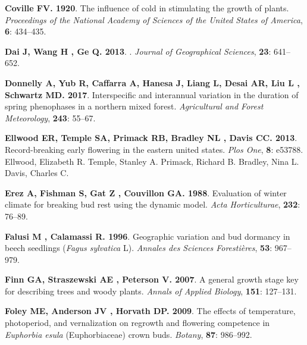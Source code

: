 \documentclass[11pt]{article}
\begin{document}
\begin{thebibliography}{69}
{\bf Coville FV}{\bf . 1920}.
\newblock The influence of cold in stimulating the growth of plants.
\newblock \emph{Proceedings of the National Academy of Sciences of the United
  States of America}, {\bf 6}: 434--435.

{\bf Dai J, Wang H , Ge Q}{\bf . 2013}.
.
\newblock \emph{Journal of Geographical Sciences}, {\bf 23}: 641--652.

{\bf Donnelly A, Yub R, Caffarra A, Hanesa J, Liang L, Desai AR, Liu L ,
  Schwartz MD}{\bf . 2017}.
\newblock Interspecific and interannual variation in the duration of spring
  phenophases in a northern mixed forest.
\newblock \emph{Agricultural and Forest Meteorology}, {\bf 243}: 55--67.

{\bf Ellwood ER, Temple SA, Primack RB, Bradley NL , Davis CC}{\bf . 2013}.
\newblock Record-breaking early flowering in the eastern united states.
\newblock \emph{Plos One}, {\bf 8}: e53788.
\newblock Ellwood, Elizabeth R. Temple, Stanley A. Primack, Richard B. Bradley,
  Nina L. Davis, Charles C.

{\bf Erez A, Fishman S, Gat Z , Couvillon GA}{\bf . 1988}.
\newblock Evaluation of winter climate for breaking bud rest using the dynamic
  model.
\newblock \emph{Acta Horticulturae}, {\bf 232}: 76--89.

{\bf Falusi M , Calamassi R}{\bf . 1996}.
\newblock Geographic variation and bud dormancy in beech seedlings
  (\textit{{F}agus sylvatica} {L}).
\newblock \emph{Annales des Sciences Foresti{\`e}res}, {\bf 53}: 967--979.

{\bf Finn GA, Straszewski AE , Peterson V}{\bf . 2007}.
\newblock A general growth stage key for describing trees and woody plants.
\newblock \emph{Annals of Applied Biology}, {\bf 151}: 127--131.

{\bf Foley ME, Anderson JV , Horvath DP}{\bf . 2009}.
\newblock The effects of temperature, photoperiod, and vernalization on
  regrowth and flowering competence in \textit{{E}uphorbia esula}
  ({E}uphorbiaceae) crown buds.
\newblock \emph{Botany}, {\bf 87}: 986--992.


\end{thebibliography}
\end{document}
